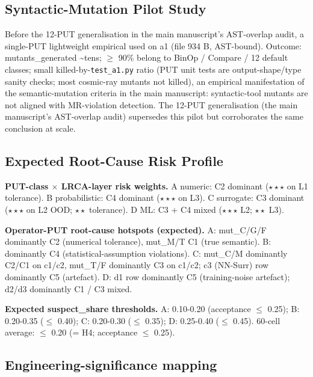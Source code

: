\documentclass[review,12pt,authoryear]{elsarticle}
\begin{document}
\subsection{Syntactic-Mutation Pilot Study}\label{b.3-cosmic-ray-a1-single-put-pilot-pre-12-put-empirical}

Before the 12-PUT generalisation in the main manuscript's AST-overlap audit, a single-PUT lightweight
empirical used  on a1 (file
934 B, AST-bound). Outcome: mutants\_generated \textasciitilde tens; $\geq$
90\% belong to BinOp / Compare / 12 default classes; small
killed-by-\texttt{test\_a1.py} ratio (PUT unit tests are
output-shape/type sanity checks; most cosmic-ray mutants not killed), an
empirical manifestation of the semantic-mutation criteria in the main manuscript: syntactic-tool mutants
are not aligned with MR-violation detection. The 12-PUT generalisation
(the main manuscript's AST-overlap audit) supersedes this pilot but corroborates the same conclusion at
scale.

\subsection{Expected Root-Cause Risk Profile}\label{b.4-expected-lrca-risk-profile}

\textbf{PUT-class $\times$ LRCA-layer risk weights.} A numeric: C2 dominant
($\star\star\star$ on L1 tolerance). B probabilistic: C4 dominant ($\star\star\star$ on L3). C
surrogate: C3 dominant ($\star\star\star$ on L2 OOD; $\star\star$ tolerance). D ML: C3 + C4
mixed ($\star\star\star$ L2; $\star\star$ L3).

\textbf{Operator-PUT root-cause hotspots (expected).} A: mut\_C/G/F
dominantly C2 (numerical tolerance), mut\_M/T C1 (true semantic). B:
dominantly C4 (statistical-assumption violations). C: mut\_C/M
dominantly C2/C1 on c1/c2, mut\_T/F dominantly C3 on c1/c2; c3 (NN-Surr)
row dominantly C5 (artefact). D: d1 row dominantly C5 (training-noise
artefact); d2/d3 dominantly C1 / C3 mixed.

\textbf{Expected suspect\_share thresholds.} A: 0.10-0.20 (acceptance $\leq$
0.25); B: 0.20-0.35 ($\leq$ 0.40); C: 0.20-0.30 ($\leq$ 0.35); D: 0.25-0.40 ($\leq$
0.45). 60-cell average: $\leq$ 0.20 (= H4; acceptance $\leq$ 0.25).

\subsection{Engineering-significance mapping}\label{b.5-engineering-significance-mapping}
\end{document}
